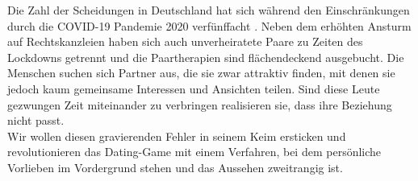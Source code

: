 
Die Zahl der Scheidungen in Deutschland hat sich während den Einschränkungen durch die COVID-19 Pandemie 2020 verfünffacht \cite{scheidungen}. Neben dem erhöhten Ansturm auf Rechtskanzleien haben sich auch unverheiratete Paare zu Zeiten des Lockdowns getrennt und die Paartherapien sind flächendeckend ausgebucht. Die Menschen suchen sich Partner aus, die sie zwar attraktiv finden, mit denen sie jedoch kaum gemeinsame Interessen und Ansichten teilen. Sind diese Leute gezwungen Zeit miteinander zu verbringen realisieren sie, dass ihre Beziehung nicht passt.\\
Wir wollen diesen gravierenden Fehler in seinem Keim ersticken und revolutionieren das Dating-Game mit einem Verfahren, bei dem persönliche Vorlieben im Vordergrund stehen und das Aussehen zweitrangig ist.


